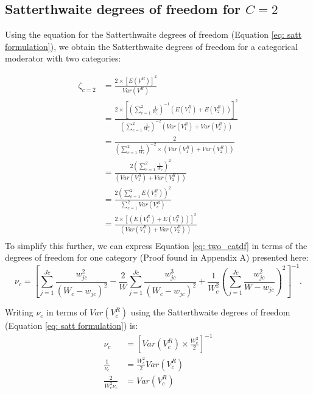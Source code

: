 \subsection{Satterthwaite  degrees of freedom for $C=2$}


Using the equation for the Satterthwaite degrees of freedom (Equation \ref{eq: satt formulation}), we obtain the Satterthwaite degrees of freedom for a categorical moderator with two categories:

\begin{equation}
    \begin{split}
        \zeta_{c = 2} & = \frac{2 \times [E(V^R)]^2}{Var(V^R)} \\
              & = \frac{2 \times \left[\left(\sum_{c=1}^2 \frac{1}{W_c}  \right)^{-1} \left(E(V^R_1) + E(V^R_2)  \right) \right]^2}{\left(\sum_{c=1}^2 \frac{1}{W_c}  \right)^{-2 } \left(Var(V^R_1) + Var(V^R_2)  \right)} \\
              & = \frac{2}{\left(\sum_{c=1}^2 \frac{1}{W_c}  \right)^{-2 } \times (Var(V_1^R) + Var(V_2^R))} \\
              & = \frac{2 \left(\sum_{c=1}^2 \frac{1}{W_c}  \right)^{2 }}{ (Var(V_1^R) + Var(V_2^R))} \\
            & = \frac{2 \left(\sum_{c=1}^2 E(V^R_c)  \right)^{2 }}{ \sum_{c=1}^2 Var(V^R_c) } \\
              & = \frac{2 \times \left[ \left(E(V^R_1) + E(V^R_2)  \right) \right]^2}{\left(Var(V^R_1) + Var(V^R_2)  \right)} \\
    \end{split}
    \nonumber
\end{equation}
To simplify this further, we can express Equation \ref{eq: two_catdf} in terms of the degrees of freedom for one category (Proof found  in Appendix A) presented here: 
\begin{equation}
   \nu_c = \left[ \sum_{j = 1} ^{Jc} \frac{w^2_{jc}}{ (W_c - w_{jc}) ^2} - \frac{2}{W} \sum_{j = 1} ^{Jc} \frac{w_{jc}^3}{(W_c - w_{jc})^2} + \frac{1}{W_c^2} \left(\sum_{j = 1} ^{Jc} \frac{w_{jc}^2}{W-w_{jc}} \right)^2 \right]^{-1}.
   \nonumber
\end{equation}

Writing $\nu_c$ in terms of $Var(V_c^R)$ using the Satterthwaite degrees of freedom (Equation \ref{eq: satt formulation}) is:
 \begin{equation}
\begin{split}
    \nu_c &= \left[ Var(V_c^R) \times \frac{W_c^2}{2} \right]^{-1} \\
    \frac{1}{\nu_c} &= \frac{W^2_c}{2}Var(V_c^R) \\
    \frac{2}{W^2_c\nu_c} &= Var(V_c^R) \\
 \nonumber 
\end{split}
 \end{equation}
 
